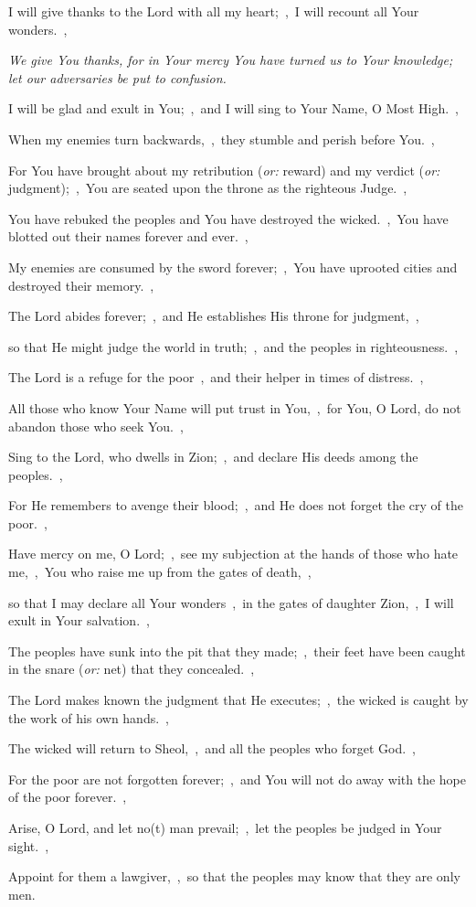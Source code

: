 \documentclass[12pt,twoside,a5paper]{article}
\newcommand{\qanona}[1]{{\liturgicalhint{Qanona.} \emph{#1}}}
\newcommand{\translationoption}[1]{\emph{or:} #1}
\begin{document}
\begin{normalparskip}
  I will give thanks to the Lord with all my heart;~\sep\ I will recount all Your wonders.~\sep

  \qanona{We give You thanks, for in Your mercy You have turned us to Your knowledge; let our adversaries be put to confusion.}

  I will be glad and exult in You;~\sep\ and I will sing to Your Name, O Most High.~\sep

  When my enemies turn backwards,~\sep\ they stumble and perish before You.~\sep

  For You have brought about my retribution (\translationoption{reward}) and my verdict (\translationoption{judgment});~\sep\ You are seated upon the throne as the righteous Judge.~\sep

  You have rebuked the peoples and You have destroyed the wicked.~\sep\ You have blotted out their names forever and ever.~\sep

  My enemies are consumed by the sword forever;~\sep\ You have uprooted cities and destroyed their memory.~\sep

  The Lord abides forever;~\sep\ and He establishes His throne for judgment,~\sep

  so that He might judge the world in truth;~\sep\ and the peoples in righteousness.~\sep

  The Lord is a refuge for the poor~\sep\ and their helper in times of distress.~\sep

  All those who know Your Name will put trust in You,~\sep\ for You, O Lord, do not abandon those who seek You.~\sep

  Sing to the Lord, who dwells in Zion;~\sep\ and declare His deeds among the peoples.~\sep

  For He remembers to avenge their blood;~\sep\ and He does not forget the cry of the poor.~\sep

  Have mercy on me, O Lord;~\sep\ see my subjection at the hands of those who hate me,~\sep\ You who raise me up from the gates of death,~\sep

  so that I may declare all Your wonders~\sep\ in the gates of daughter Zion,~\sep\ I will exult in Your salvation.~\sep

  The peoples have sunk into the pit that they made;~\sep\ their feet have been caught in the snare (\translationoption{net}) that they concealed.~\sep

  The Lord makes known the judgment that He executes;~\sep\ the wicked is caught by the work of his own hands.~\sep

  The wicked will return to Sheol,~\sep\ and all the peoples who forget God.~\sep

  For the poor are not forgotten forever;~\sep\ and You will not do away with the hope of the poor forever.~\sep

  Arise, O Lord, and let no(t) man prevail;~\sep\ let the peoples be judged in Your sight.~\sep

  Appoint for them a lawgiver,~\sep\ so that the peoples may know that they are only men.
\end{normalparskip}
\end{document}
